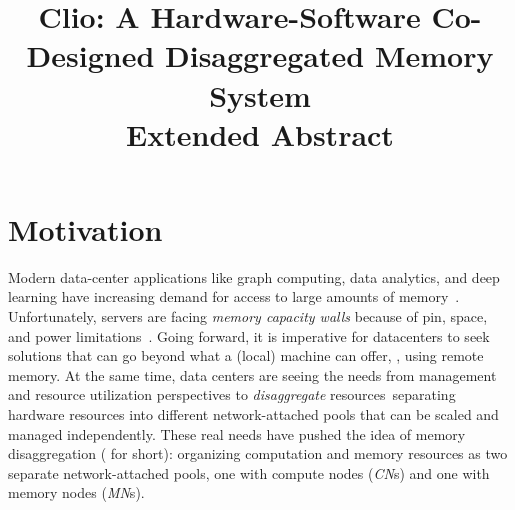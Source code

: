 



%
%

%

\title{Clio: A Hardware-Software Co-Designed Disaggregated Memory System \\ \textbf{Extended Abstract}\vspace{-0.3in}}

\date{}

\maketitle

\thispagestyle{empty}







\section{Motivation}

Modern data-center applications like graph computing, data analytics, and deep learning have increasing demand for access to large amounts of memory~\cite{FastSwap}.
Unfortunately, servers are facing {\em memory capacity walls} because of pin, space, and power limitations~\cite{HP-MemoryEvol,ITRS14,MemoryWall95}.
Going forward, it is imperative for datacenters to seek solutions that can go beyond what a (local) machine can offer, \ie, using remote memory.
At the same time, data centers are seeing the needs from management and resource utilization perspectives
to {\em disaggregate} resources~\cite{Ali-SinglesDay,SnowFlake-NSDI20,FB1}\textemdash separating hardware resources into different network-attached pools 
that can be scaled and managed independently.
These real needs have pushed the idea of memory disaggregation ({\em \md} for short):
organizing computation and memory resources as two separate network-attached
pools, one with compute nodes ({\em CN}s) and one with memory nodes ({\em MN}s).

